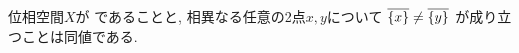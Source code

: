\documentclass[uplatex, dvipdfmx, a4paper, 12pt, class=jsarticle, crop=false]{standalone}
\begin{document}
\begin{problem}[1.5.A]\label{eng-1-5-A-problem}
	位相空間\(X\)が  であることと,
	相異なる任意の2点\(x, y\)について
	\(\topbar{\lrbrace{x}} \neq \topbar{\lrbrace{y}}\)
	が成り立つことは同値である.
\end{problem}
\end{document}

